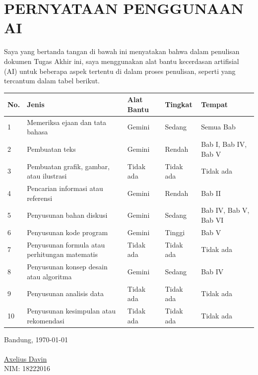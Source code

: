 \chapter*{PERNYATAAN PENGGUNAAN AI}
Saya yang bertanda tangan di bawah ini menyatakan bahwa dalam penulisan dokumen Tugas Akhir ini,
saya menggunakan alat bantu kecerdasan artifisial (AI) untuk beberapa aspek tertentu di dalam proses penulisan,
seperti yang tercantum dalam tabel berikut.
\begin{table}[h]
\begin{tabular}{|p{0.5cm}| p{4cm} | p{2.5cm} | p{2.5cm} | p{3cm} @{}| }
\hline
\textbf{No.} & \textbf{Jenis} & \textbf{Alat Bantu} & \textbf{Tingkat} & \textbf{Tempat}\\
\hline
1 & Memeriksa ejaan dan tata bahasa & Gemini & Sedang & Semua Bab \\
\hline
2 & Pembuatan teks & Gemini & Rendah & Bab I, Bab IV, Bab V \\
\hline
3 & Pembuatan grafik, gambar, atau ilustrasi & Tidak ada & Tidak ada & Tidak ada \\
\hline
4 & Pencarian informasi atau referensi & Gemini & Rendah & Bab II \\
\hline
5 & Penyusunan bahan diskusi & Gemini & Sedang & Bab IV, Bab V, Bab VI \\
\hline
6 & Penyusunan kode program & Gemini & Tinggi & Bab V \\
\hline
7 & Penyusunan formula atau perhitungan matematis & Tidak ada & Tidak ada & Tidak ada \\
\hline
8 & Penyusunan konsep desain atau algoritma & Gemini & Sedang & Bab IV \\
\hline
9 & Penyusunan analisis data & Tidak ada & Tidak ada & Tidak ada \\
\hline
10 & Penyusunan kesimpulan atau rekomendasi & Tidak ada & Tidak ada & Tidak ada \\
\hline
\end{tabular}
\end{table}


Bandung, \today\\
\\[2cm]

\underline{Axelius Davin} \\
NIM: 18222016